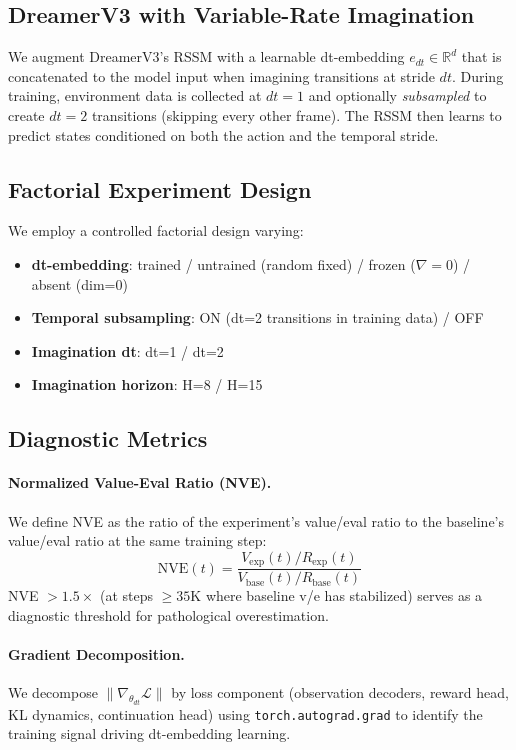 \documentclass[10pt,twocolumn]{article}
\begin{document}
\subsection{DreamerV3 with Variable-Rate Imagination}

We augment DreamerV3's RSSM with a learnable dt-embedding $e_{dt} \in \mathbb{R}^d$ that is concatenated to the model input when imagining transitions at stride $dt$. During training, environment data is collected at $dt=1$ and optionally \emph{subsampled} to create $dt=2$ transitions (skipping every other frame). The RSSM then learns to predict states conditioned on both the action and the temporal stride.

\subsection{Factorial Experiment Design}

We employ a controlled factorial design varying:
\begin{itemize}
\item \textbf{dt-embedding}: trained / untrained (random fixed) / frozen ($\nabla = 0$) / absent (dim=0)
\item \textbf{Temporal subsampling}: ON (dt=2 transitions in training data) / OFF
\item \textbf{Imagination dt}: dt=1 / dt=2
\item \textbf{Imagination horizon}: H=8 / H=15
\end{itemize}

\subsection{Diagnostic Metrics}

\paragraph{Normalized Value-Eval Ratio (NVE).}
We define NVE as the ratio of the experiment's value/eval ratio to the baseline's value/eval ratio at the same training step:
\[
\text{NVE}(t) = \frac{V_{\text{exp}}(t) / R_{\text{exp}}(t)}{V_{\text{base}}(t) / R_{\text{base}}(t)}
\]
NVE $> 1.5\times$ (at steps $\geq 35$K where baseline v/e has stabilized) serves as a diagnostic threshold for pathological overestimation.

\paragraph{Gradient Decomposition.}
We decompose $\|\nabla_{\theta_{dt}} \mathcal{L}\|$ by loss component (observation decoders, reward head, KL dynamics, continuation head) using \texttt{torch.autograd.grad} to identify the training signal driving dt-embedding learning.
\end{document}
